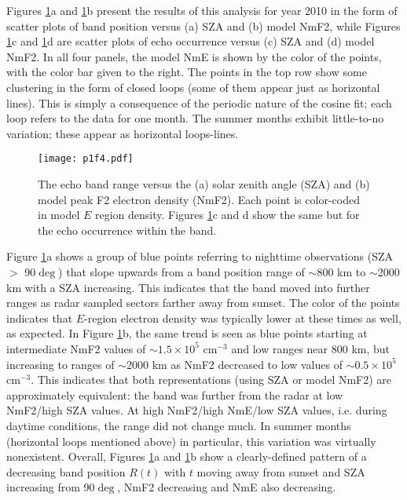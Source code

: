 Figures \ref{fig:scatter}a and \ref{fig:scatter}b present the results of this analysis for year 2010 in the form of scatter plots of band position versus (a) SZA and (b) model NmF2, while Figures \ref{fig:scatter}c and \ref{fig:scatter}d are scatter plots of echo occurrence versus (c) SZA and (d) model NmF2. In all four panels, the model NmE is shown by the color of the points, with the color bar given to the right. The points in the top row show some clustering in the form of closed loops (some of them appear just as horizontal lines). This is simply a consequence of the periodic nature of the cosine fit; each loop refers to the data for one month. The summer months exhibit little-to-no variation; these appear as horizontal loops-lines.

\begin{figure}
\texttt{[image: p1f4.pdf]}
\caption{The echo band range versus the (a) solar zenith angle (SZA) and (b) model peak F2 electron density (NmF2). Each point is color-coded in model \(E\) region density. Figures \ref{fig:scatter}c and d show the same but for the  echo occurrence within the band.}
\label{fig:scatter}
\end{figure}

Figure \ref{fig:scatter}a shows a group of blue points referring to nighttime observations (SZA \(>\) 90\(\deg\)) that slope upwards from a band position range of \(\sim\)800 km to \(\sim\)2000 km with a SZA increasing. This indicates that the band moved into further ranges as radar sampled sectors farther away from sunset. The color of the points indicates that \(E\)-region electron density was typically lower at these times as well, as expected. In Figure \ref{fig:scatter}b, the same trend is seen as blue points starting at intermediate NmF2 values of \(\sim1.5 \times 10^5\) cm\(^{-3}\) and low ranges near 800 km, but increasing to ranges of \(\sim\)2000 km as NmF2 decreased to low values of \(\sim0.5 \times 10^5\) cm\(^{-3}\). This indicates that both representations (using SZA or model NmF2) are approximately equivalent: the band was further from the radar at low NmF2/high SZA values. At high NmF2/high NmE/low SZA values, i.e. during daytime conditions, the range did not change much. In summer months (horizontal loops mentioned above) in particular, this variation was virtually nonexistent. Overall, Figures \ref{fig:scatter}a and \ref{fig:scatter}b show a clearly-defined pattern of a decreasing band position \(R\left(t\right)\) with \(t\) moving away from sunset and SZA increasing from 90\(\deg\), NmF2 decreasing and NmE also decreasing.

